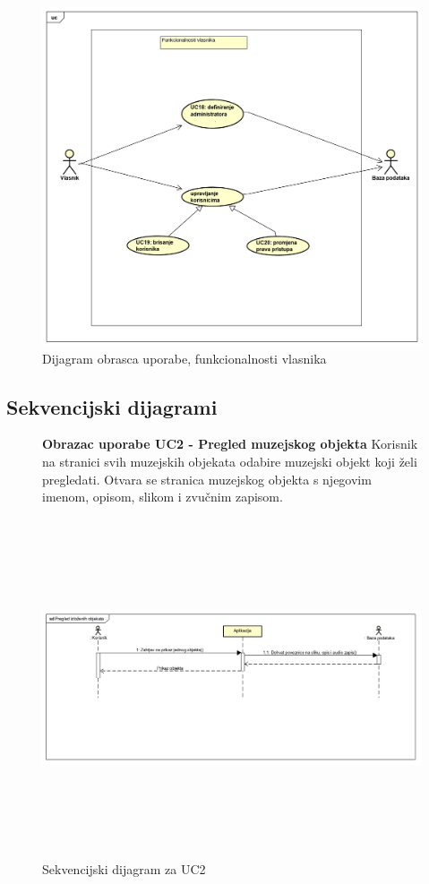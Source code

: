 \begin{figure}[H]
	\includegraphics[scale=0.4]{slike/vlasnik.png}
	\centering
	\caption{Dijagram obrasca uporabe, funkcionalnosti vlasnika}
	\label{fig:promjene}
\end{figure}

\newpage

\subsection{Sekvencijski dijagrami}

				\begin{figure}[H]
					\textbf{Obrazac uporabe UC2 - Pregled muzejskog objekta} 
					\newline
					\newline
					Korisnik na stranici svih muzejskih objekata odabire muzejski objekt koji želi pregledati. Otvara se stranica muzejskog objekta s njegovim imenom, opisom, slikom i zvučnim zapisom. \par
					\includegraphics[width=170mm,height=100mm]{slike/Pregled_izlozenih_objekata.png} 
					\newline
					\centering
					\caption{Sekvencijski dijagram za UC2}
					\label{fig:promjene}
				\end{figure}

